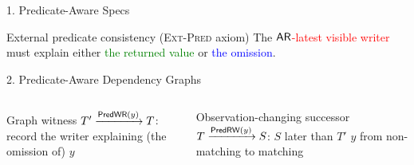 
\begin{frame}{1. Predicate-Aware Specs}
  \begin{center}
  \end{center}

  \vfill
  \begin{block}{External predicate consistency (\textsc{Ext-Pred} axiom)}
    The \textcolor{red}{$\mathsf{AR}$-latest visible writer}
    must explain either \textcolor{green}{the returned value}
    or \textcolor{blue}{the omission}.
  \end{block}
\end{frame}

\begin{frame}{2. Predicate-Aware Dependency Graphs}
  \begin{columns}[c,onlytextwidth]
      \begin{block}{Graph witness}
        $T' \xrightarrow{\mathsf{PredWR}(y)} T$:
        record the writer explaining (the omission of) $y$
      \end{block}
      \vspace{1em}
      \begin{block}{Observation-changing successor}
        $T \xrightarrow{\mathsf{PredRW}(y)} S$:
        $S$ later than $T'$  $y$
        from non-matching to matching
      \end{block}
  \end{columns}
\end{frame}

